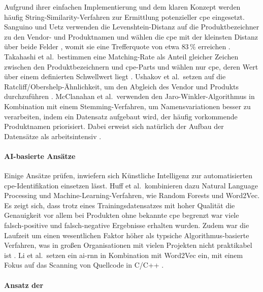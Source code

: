 Aufgrund ihrer einfachen Implementierung und dem klaren Konzept werden häufig String-Similarity-Verfahren zur Ermittlung potenzieller \acrshort{cpe} eingesetzt.
Sanguino und Uetz verwenden die Levenshtein-Distanz auf die Produktbezeichner zu den Vendor- und Produktnamen und wählen die \acrshort{cpe} mit der kleinsten Distanz über beide Felder \autocite{Sanguino_Uetz_2017}, womit sie eine Trefferquote von etwa $83\,\%$ erreichen \autocite{Idrissi_Sebai_Faroukhi_Mahouachi_2024}.
Takahashi et al.\ bestimmen eine Matching-Rate als Anteil gleicher Zeichen zwischen den Produktbezeichnern und \acrshort{cpe}-Parts und wählen nur \acrshort{cpe}, deren Wert über einem definierten Schwellwert liegt \autocite{Takahashi_Miyamoto_Nakao_2016}.
Ushakov et al.\ setzen auf die Ratcliff/Obershelp-Ähnlichkeit, um den Abgleich des Vendor und Produkts durchzuführen \autocite{Ushakov_Doynikova_Novikova_Kotenko_2021}.
McClanahan et al.\ verwenden den Jaro-Winkler-Algorithmus in Kombination mit einem Stemming-Verfahren, um Namensvariationen besser zu verarbeiten, indem ein Datensatz aufgebaut wird, der häufig vorkommende Produktnamen priorisiert.
Dabei erweist sich natürlich der Aufbau der Datensätze als arbeitsintensiv \autocite{McClanahan_Li_2024}.

\paragraph{AI-basierte Ansätze}

Einige Ansätze prüfen, inwiefern sich Künstliche Intelligenz zur automatisierten \acrshort{cpe}-Identifikation einsetzen lässt.
Huff et al.\ kombinieren dazu Natural Language Processing und Machine-Learning-Verfahren, wie Random Forests und Word2Vec.
Es zeigt sich, dass trotz eines Trainingsdatensatzes mit hoher Qualität die Genauigkeit vor allem bei Produkten ohne bekannte \acrshort{cpe} begrenzt war viele falsch-positive und falsch-negative Ergebnisse erhalten wurden.
Zudem war die Laufzeit um einen wesentlichen Faktor höher als typsiche Algorithmus-basierte Verfahren, was in großen Organisationen mit vielen Projekten nicht praktikabel ist \autocite{Huff2021Recommender}.
Li et al.\ setzen ein \acrfull{ai-rnn} in Kombination mit Word2Vec ein, mit einem Fokus auf das Scanning von Quellcode in C/C++ \autocite{8846081}.

\paragraph{Ansatz der \metaeffekt}

